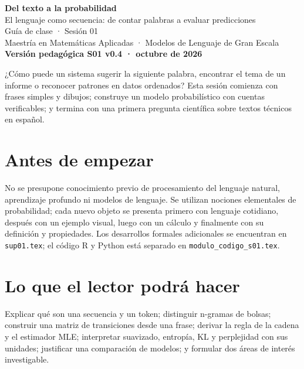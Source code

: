 \documentclass[11pt,a4paper,oneside]{report}
\begin{document}
\begin{center}
{\Huge\bfseries\color{azul} Del texto a la probabilidad}\\[9pt]
{\LARGE El lenguaje como secuencia: de contar palabras a evaluar predicciones}\\[7pt]
{\large Guía de clase · Sesión 01}\\[5pt]
Maestría en Matemáticas Aplicadas · Modelos de Lenguaje de Gran Escala\\[5pt]
\textbf{Versión pedagógica S01 v0.4 · octubre de 2026}
\end{center}
\begin{idea}
¿Cómo puede un sistema sugerir la siguiente palabra, encontrar el tema de un informe o reconocer patrones en datos ordenados? Esta sesión comienza con frases simples y dibujos; construye un modelo probabilístico con cuentas verificables; y termina con una primera pregunta científica sobre textos técnicos en español.
\end{idea}
\section*{Antes de empezar}
No se presupone conocimiento previo de procesamiento del lenguaje natural, aprendizaje profundo ni modelos de lenguaje. Se utilizan nociones elementales de probabilidad; cada nuevo objeto se presenta primero con lenguaje cotidiano, después con un ejemplo visual, luego con un cálculo y finalmente con su definición y propiedades. Los desarrollos formales adicionales se encuentran en \texttt{sup01.tex}; el código R y Python está separado en \texttt{modulo\_codigo\_s01.tex}.
\section*{Lo que el lector podrá hacer}
Explicar qué son una secuencia y un token; distinguir n-gramas de bolsas; construir una matriz de transiciones desde una frase; derivar la regla de la cadena y el estimador MLE; interpretar suavizado, entropía, KL y perplejidad con sus unidades; justificar una comparación de modelos; y formular dos áreas de interés investigable.
\clearpage\begingroup\footnotesize\tableofcontents\endgroup\clearpage











\end{document}

